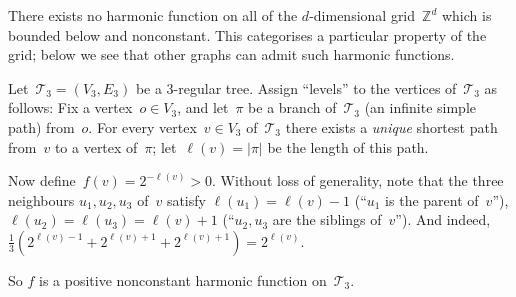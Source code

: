 \documentclass[12pt]{article}
\newcommand{\Ints}{\mathbb{Z}}
\newcommand{\tree}{\mathcal{T}_3}
\begin{document}
There exists no harmonic function on all of the $d$-dimensional grid~$\Ints^d$ which is bounded below and nonconstant. This categorises a particular property of the grid; below we see that other graphs can admit such harmonic functions.

Let~$\tree=(V_3,E_3)$ be a 3-regular tree.  Assign ``levels'' to the vertices of~$\tree$ as follows:  Fix a vertex~$o\in V_3$, and let~$\pi$ be a branch of~$\tree$ (an infinite simple path) from~$o$.  For every vertex~$v\in V_3$ of~$\tree$ there exists a \emph{unique} shortest path from~$v$ to a vertex of~$\pi$; let~$\ell(v)=\left|\pi\right|$ be the length of this path.

Now define~$f(v)=2^{-\ell(v)} > 0$.  Without loss of generality, note that the three neighbours $u_1,u_2,u_3$ of~$v$ satisfy $\ell(u_1)=\ell(v)-1$ (``$u_1$ is the parent of~$v$''), $\ell(u_2)=\ell(u_3)=\ell(v)+1$ (``$u_2, u_3$ are the siblings of~$v$'').  And indeed,
$\frac{1}{3}\left(2^{\ell(v)-1}+2^{\ell(v)+1}+2^{\ell(v)+1}\right)
= 2^{\ell(v)}$.

So $f$ is a positive nonconstant harmonic function on~$\tree$.
\end{document}
